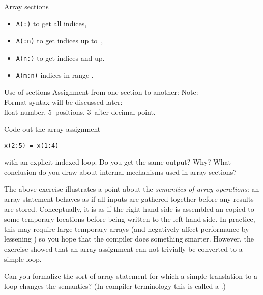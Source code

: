 \begin{block}{Array sections}
  \label{sl:farray-sections}
  \begin{itemize}
  \item \lstinline{A(:)} %
    to get all indices,
  \item \lstinline{A(:n)} %
    to get indices up to~,
  \item \lstinline{A(n:)} %
    to get indices  and up.
  \item \lstinline{A(m:n)}
    indices in range .
  \end{itemize}
\end{block}

\begin{block}{Use of sections}
  \label{sl:farray-sectionassign}
  Assignment from one section to another:
  Note: \\
  Format syntax will be discussed later:\\
    float number, 5~positions, 3~after decimal point.
\end{block}

\begin{exercise}
  \label{ex:sect-vs-loop}
  Code out the array assignment
\begin{lstlisting}
x(2:5) = x(1:4)
\end{lstlisting}
with an explicit indexed loop.
  Do you get the same output? Why? What conclusion do
  you draw about internal mechanisms used in array sections?
\end{exercise}

The above exercise illustrates a point about the
\emph{semantics of array operations}:
an array statement behaves as if all inputs are gathered together
before any results are stored.
Conceptually, it is as if the right-hand side is assembled an copied
to some temporary locations before being written to the left-hand side.
In practice, this may require large temporary arrays
(and negatively affect performance by lessening )
so you hope that the compiler does something smarter.
However, the exercise showed that an array assignment can not trivially
be converted to a simple loop.

\begin{exercise}
  Can you formalize the sort of array statement for which a simple
  translation to a loop changes the semantics? (In compiler
  terminology this is called a .)
\end{exercise}

